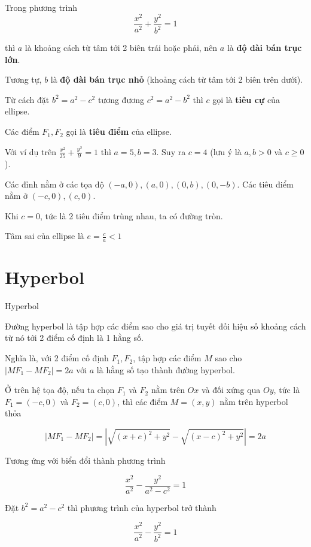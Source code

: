 Trong phương trình $$\frac{x^2}{a^2} + \frac{y^2}{b^2} = 1$$

thì $a$ là khoảng cách từ tâm tới 2 biên trái hoặc phải, nên $a$ là \textbf{độ dài bán trục lớn}.

Tương tự, $b$ là \textbf{độ dài bán trục nhỏ} (khoảng cách từ tâm tới 2 biên trên dưới).

Từ cách đặt $b^2 = a^2 - c^2$ tương đương $c^2 = a^2 - b^2$ thì $c$ gọi là \textbf{tiêu cự} của ellipse.

Các điểm $F_1, F_2$ gọi là \textbf{tiêu điểm} của ellipse.

Với ví dụ trên $\frac{x^2}{25} + \frac{y^2}{9} = 1$ thì $a=5, b=3$. Suy ra $c=4$ (lưu ý là $a, b > 0$ và $c \geq 0$).

Các đỉnh nằm ở các tọa độ $(-a, 0), (a, 0), (0, b), (0, -b)$. Các tiêu điểm nằm ở $(-c, 0), (c, 0)$.

\begin{remark}
    Khi $c=0$, tức là 2 tiêu điểm trùng nhau, ta có đường tròn.
\end{remark}

Tâm sai của ellipse là $e = \frac{c}{a} < 1$

\section{Hyperbol}

\begin{defblock}{Hyperbol}

    Đường hyperbol là tập hợp các điểm sao cho giá trị tuyết đối hiệu số khoảng cách từ nó tới 2 điểm cố định là 1 hằng số.
\end{defblock}

Nghĩa là, với 2 điểm cố định $F_1, F_2$, tập hợp các điểm $M$ sao cho $| M F_1 - M F_2 | = 2a$ với $a$ là hằng số tạo thành đường hyperbol.

Ở trên hệ tọa độ, nếu ta chọn $F_1$ và $F_2$ nằm trên $Ox$ và đối xứng qua $Oy$, tức là $F_1 = (-c, 0)$ và $F_2 = (c, 0)$, thì các điểm $M = (x, y)$ nằm trên hyperbol thỏa

$$| MF_1 - MF_2 | = | \sqrt{(x+c)^2 + y^2} - \sqrt{(x-c)^2 + y^2} | = 2a$$

Tương ứng với biển đổi thành phương trình

$$\frac{x^2}{a^2} - \frac{y^2}{a^2 - c^2} = 1$$

Đặt $b^2 = a^2 - c^2$ thì phương trình của hyperbol trở thành

$$\frac{x^2}{a^2} - \frac{y^2}{b^2} = 1$$

